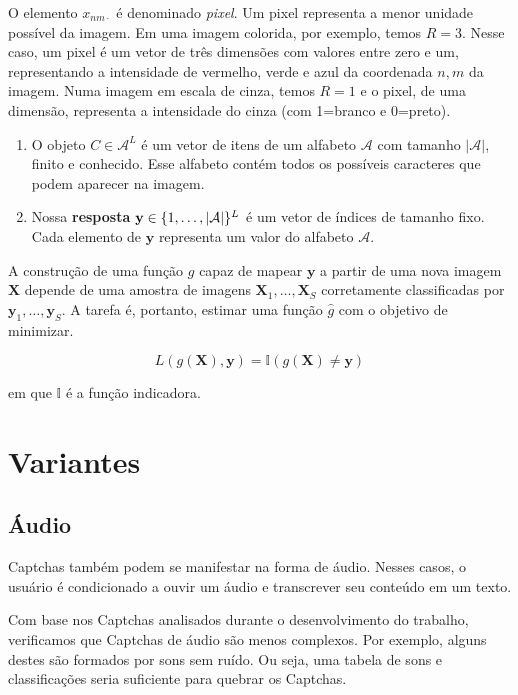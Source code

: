 \documentclass[12pt,]{report}
\begin{document}
O elemento \(x_{nm\cdot}\) é denominado \emph{pixel}. Um pixel
representa a menor unidade possível da imagem. Em uma imagem colorida,
por exemplo, temos \(R=3\). Nesse caso, um pixel é um vetor de três
dimensões com valores entre zero e um, representando a intensidade de
vermelho, verde e azul da coordenada \(n,m\) da imagem. Numa imagem em
escala de cinza, temos \(R=1\) e o pixel, de uma dimensão, representa a
intensidade do cinza (com 1=branco e 0=preto).

\begin{enumerate}
\def\labelenumi{\arabic{enumi}.}
\setcounter{enumi}{1}
\item
  O objeto \(C \in \mathcal A^L\) é um vetor de itens de um alfabeto
  \(\mathcal A\) com tamanho \(|\mathcal A|\), finito e conhecido. Esse
  alfabeto contém todos os possíveis caracteres que podem aparecer na
  imagem.
\item
  Nossa \textbf{resposta}
  \(\mathbf y \in \mathbb \{1, \dots, |\mathcal A|\}^L\) é um vetor de
  índices de tamanho fixo. Cada elemento de \(\mathbf y\) representa um
  valor do alfabeto \(\mathcal A\).
\end{enumerate}

A construção de uma função \(g\) capaz de mapear \(\mathbf y\) a partir
de uma nova imagem \(\mathbf X\) depende de uma amostra de imagens
\(\mathbf X_1, \dots, \mathbf X_S\) corretamente classificadas por
\(\mathbf y_1, \dots, \mathbf y_S\). A tarefa é, portanto, estimar uma
função \(\hat g\) com o objetivo de minimizar.

\[
L(g(\mathbf X), \mathbf y) = \mathbb I(g(\mathbf X) \neq \mathbf y)
\]

em que \(\mathbb I\) é a função indicadora.

\section{Variantes}\label{variantes}

\subsection{Áudio}\label{audio}

Captchas também podem se manifestar na forma de áudio. Nesses casos, o
usuário é condicionado a ouvir um áudio e transcrever seu conteúdo em um
texto.

Com base nos Captchas analisados durante o desenvolvimento do trabalho,
verificamos que Captchas de áudio são menos complexos. Por exemplo,
alguns destes são formados por sons sem ruído. Ou seja, uma tabela de
sons e classificações seria suficiente para quebrar os Captchas.
\end{document}
